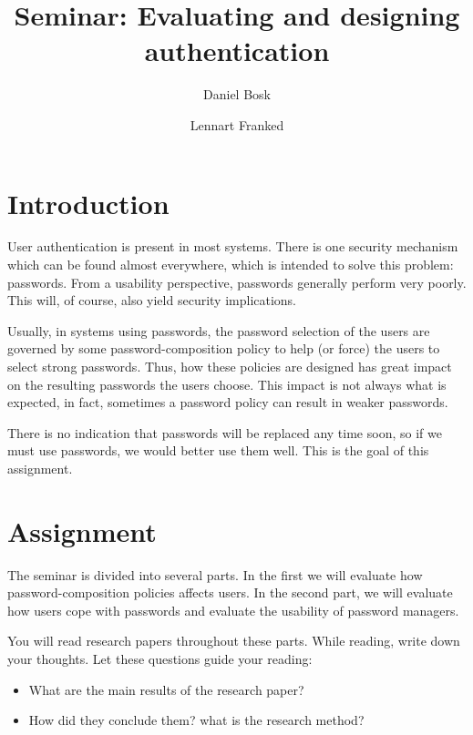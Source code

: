 \title{Seminar: Evaluating and designing authentication}

\author{%
  Daniel Bosk
  \and
  Lennart Franked
}

\maketitle

\begin{abstract}
  
\end{abstract}


\section{Introduction}%
\label{sec:intro}

User authentication is present in most systems.
There is one security mechanism which can be found almost everywhere, which is 
intended to solve this problem: passwords.
From a usability perspective, passwords generally perform very poorly.
This will, of course, also yield security implications.

Usually, in systems using passwords, the password selection of the users are 
governed by some password-composition policy to help (or force) the users to 
select strong passwords.
Thus, how these policies are designed has great impact on the resulting 
passwords the users choose.
This impact is not always what is expected, in fact, sometimes a password 
policy can result in weaker passwords.

There is no indication that passwords will be replaced any time soon, so if we 
must use passwords, we would better use them well.
This is the goal of this assignment.


\section{Assignment}%
\label{sec:tasks}

The seminar is divided into several parts.
In the first we will evaluate how password-composition policies affects users.
In the second part, we will evaluate how users cope with passwords and evaluate 
the usability of password managers.

You will read research papers throughout these parts.
While reading, write down your thoughts.
Let these questions guide your reading:
\begin{itemize}
  \item What are the main results of the research paper?
  \item How did they conclude them?
    \Ie what is the research method?
\end{itemize}


